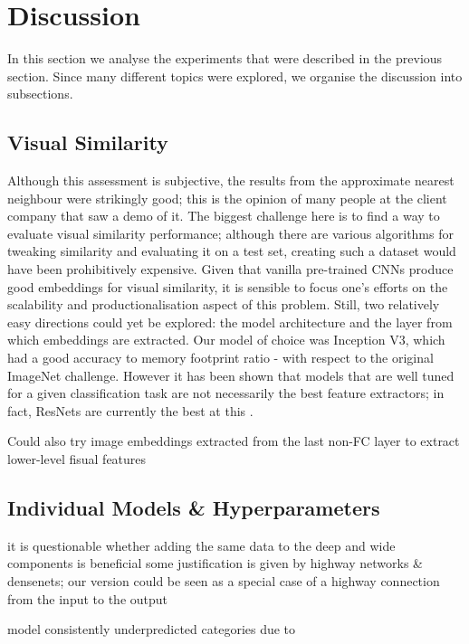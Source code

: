 \chapter{Discussion}

In this section we analyse the experiments that were described in the previous section.
Since many different topics were explored, we organise the discussion into subsections.

\section{Visual Similarity}

Although this assessment is subjective, the results from the approximate nearest neighbour were strikingly good; this is the opinion of many people at the client company that saw a demo of it.
The biggest challenge here is to find a way to evaluate visual similarity performance; although there are various algorithms for tweaking similarity and evaluating it on a test set, creating such a dataset would have been prohibitively expensive.
Given that vanilla pre-trained CNNs produce good embeddings for visual similarity, it is sensible to focus one's efforts on the scalability and productionalisation aspect of this problem.
Still, two relatively easy directions could yet be explored: the model architecture and the layer from which embeddings are extracted.
Our model of choice was Inception V3, which had a good accuracy to memory footprint ratio - with respect to the original ImageNet challenge.
However it has been shown that models that are well tuned for a given classification task are not necessarily the best feature extractors; in fact, ResNets are currently the best at this \cite{img_feature_extract}.

Could also try image embeddings extracted from the last non-FC layer to extract lower-level fisual features

\section{Individual Models \& Hyperparameters}

it is questionable whether adding the same data to the deep and wide components is beneficial
  some justification is given by highway networks \& densenets; our version could be seen as a special case of a highway connection from the input to the output

model consistently underpredicted categories due to

